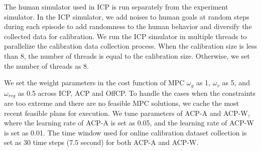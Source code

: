 The human simulator used in ICP is run separately from the experiment simulator. In the ICP simulator, we add noises to human goals at random steps during each episode to add randomness to the human behavior and diversify the collected data for calibration. We run the ICP simulator in multiple threads to parallelize the calibration data collection process. When the calibration size is less than 8, the number of threads is equal to the calibration size. Otherwise, we set the number of threads as 8. 

We set the weight parameters in the cost function of MPC $\omega_{g}$ as 1, $\omega_{v}$ as 5, and $\omega_{reg}$ as 0.5 across ICP, ACP and OffCP. To handle the cases when the constraints are too extreme and there are no feasible MPC solutions, we cache the most recent feasible plans for execution. We tune parameters of ACP-A and ACP-W, where the learning rate of ACP-A is set as 0.05, and the learning rate of ACP-W is set as 0.01. The time window used for online calibration dataset collection is set as 30 time steps (7.5 second) for both ACP-A and ACP-W. 

